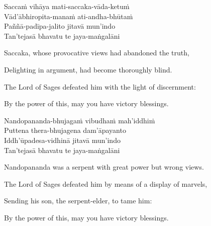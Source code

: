 \begin{pali-hang-continued}
  Saccaṁ vihāya mati-saccaka-vāda-ketuṁ\\
  Vād'ābhiropita-manaṁ ati-andha-bhūtaṁ\\
  Paññā-padīpa-jalito jitavā mun'indo\\
  Tan'tejasā bhavatu te jaya-maṅgalāni
\end{pali-hang-continued}

\ifbfive\clearpage\fi
\ifninebythirteen\clearpage\fi

\begin{english-verses}
  \begin{english-hang-first-line}
  Saccaka, whose provocative views had abandoned the truth,\\
  \end{english-hang-first-line}
  Delighting in argument, had become thoroughly blind.\\
  \begin{english-hang-together-verses}
  The Lord of Sages defeated him with the light of discernment:\\
  \end{english-hang-together-verses}
  \begin{english-hang-together-verses}
  By the power of this, may you have victory blessings.
  \end{english-hang-together-verses}
\end{english-verses}

\ifafive\clearpage\fi

\begin{pali-hang-continued}
  Nandopananda-bhujagaṁ vibudhaṁ mah'iddhiṁ\\
  Puttena thera-bhujagena dam'āpayanto\\
  Iddh'ūpadesa-vidhinā jitavā mun'indo\\
  Tan'tejasā bhavatu te jaya-maṅgalāni
\end{pali-hang-continued}

\begin{english-verses}
  \begin{english-hang-first-line}
  Nandopananda was a serpent with great power but wrong views.\\
  \end{english-hang-first-line}
  \begin{english-hang-together-verses}
  The Lord of Sages defeated him by means of a display of marvels,\\
  \end{english-hang-together-verses}
  \begin{english-hang-together-verses}
  Sending his son, the serpent-elder, to tame him:\\
  \end{english-hang-together-verses}
  \begin{english-hang-together-verses}
  By the power of this, may you have victory blessings.
  \end{english-hang-together-verses}
\end{english-verses}

